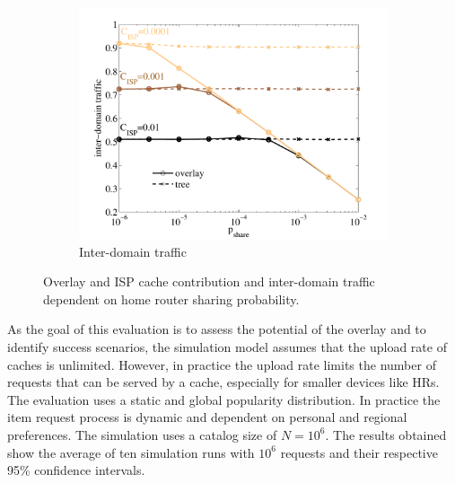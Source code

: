 \begin{figure}[tb]
\begin{subfigure}[t]{0.49\textwidth}
\includegraphics[width=\textwidth]{hierarchical/simulative/figures/overlay_interdomain}
\caption{Inter-domain traffic}
\label{fig:overlay_interdomain}
\end{subfigure}
\caption{Overlay and ISP cache contribution and inter-domain traffic dependent on home router sharing probability.}
\end{figure}

As the goal of this evaluation is to assess the potential of the overlay and to identify success scenarios, the simulation model assumes that the upload rate of caches is unlimited. However, in practice the upload rate limits the number of requests that can be served by a cache, especially for smaller devices like HRs. The evaluation uses a static and global popularity distribution. In practice the item request process is dynamic and dependent on personal and regional preferences.
The simulation uses a catalog size of $N=10^6$. The results obtained show the average of ten simulation runs with $10^6$ requests and their respective 95\% confidence intervals.


